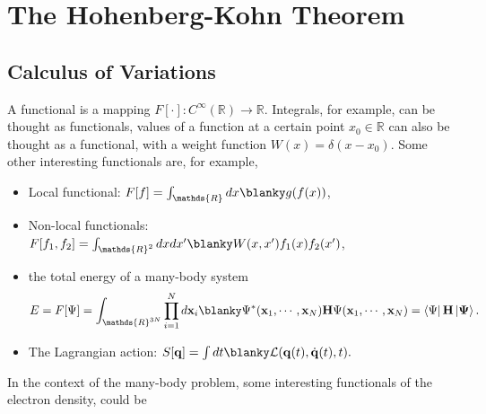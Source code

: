 \documentclass{homework}
\begin{document}

\section{The Hohenberg-Kohn Theorem}

\subsection{Calculus of Variations}

A functional is a mapping $F[\cdot]: C^{\infty}(\mathds{R})\rightarrow\mathds{R}$. Integrals, for example, can be thought as functionals, values of a function at a certain point $x_0 \in \mathds{R}$ can also be thought as a functional, with a weight function $W(x) = \delta(x-x_0)$. Some other interesting functionals are, for example, 

\begin{itemize}
    \item Local functional: $F[f] = \int_{\mathds{R}} dx \blanky g(f(x))$,
    \item Non-local functionals: 
    $F[f_1, f_2] =\int_{\mathds{R}^2} dx dx' \blanky W(x,x') f_1(x) f_2(x')$, 
    \item the total energy of a many-body system 
    $$
    E = F[\Psi] = \int_{\mathds{R}^{3N}} \prod_{i=1}^{N} d{\bf x}_i \blanky \Psi^{*}({\bf x}_1, \cdots, {\bf x}_N) {\bf H} \Psi({\bf x}_1, \cdots, {\bf x}_N) = \bra{\Psi}{\bf H}\ket{\Psi}.
    $$
    \item The Lagrangian action: $
    S[{\bf q}] = \int dt \blanky \mathcal{L}({\bf q}(t), \dot{\bf q}(t), t).$
\end{itemize}

In the context of the many-body problem, some interesting functionals of the electron density, could be 
\end{document}
